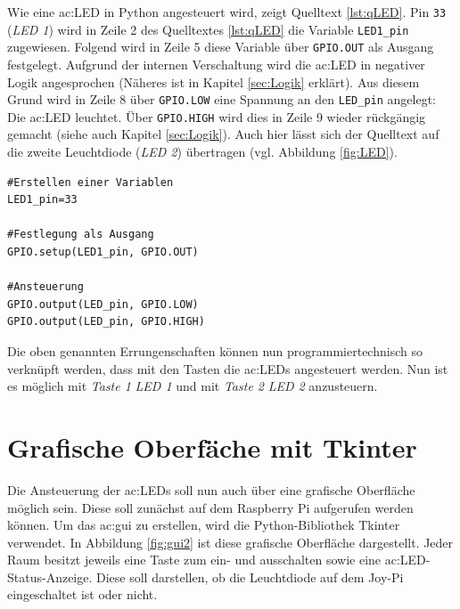 \newpage

Wie eine \gls{ac:LED} in Python angesteuert wird, zeigt Quelltext \ref{lst:qLED}. Pin \texttt{33} (\textit{LED 1}) wird in Zeile 2 des Quelltextes \ref{lst:qLED} die Variable \texttt{LED1\_pin} zugewiesen. Folgend wird in Zeile 5 diese Variable über \texttt{GPIO.OUT} als Ausgang festgelegt. Aufgrund der internen Verschaltung wird die \gls{ac:LED} in negativer Logik angesprochen (Näheres ist in Kapitel \ref{sec:Logik} erklärt). Aus diesem Grund wird in Zeile 8 über \texttt{GPIO.LOW} eine Spannung an den \texttt{LED\_pin} angelegt: Die \gls{ac:LED} leuchtet. Über \texttt{GPIO.HIGH} wird dies in Zeile 9 wieder rückgängig gemacht (siehe auch Kapitel \ref{sec:Logik}). Auch hier lässt sich der Quelltext auf die zweite Leuchtdiode (\textit{LED 2}) übertragen (vgl. Abbildung \ref{fig:LED}).\\[0.2cm]

\begin{lstlisting}[style=python, caption=Python-Code zur Ansteuerung einer LED, label=lst:qLED]
#Erstellen einer Variablen
LED1_pin=33

#Festlegung als Ausgang
GPIO.setup(LED1_pin, GPIO.OUT)

#Ansteuerung
GPIO.output(LED_pin, GPIO.LOW)
GPIO.output(LED_pin, GPIO.HIGH)

\end{lstlisting}

Die oben genannten Errungenschaften können nun programmiertechnisch so verknüpft werden, dass mit den Tasten die \gls{ac:LED}s angesteuert werden. Nun ist es möglich mit \textit{Taste 1} \textit{LED 1} und mit \textit{Taste 2}  \textit{LED 2} anzusteuern.
 
\section{Grafische Oberfäche mit Tkinter}
\label{sec:gui}
Die Ansteuerung der \gls{ac:LED}s soll nun auch über eine grafische Oberfläche möglich sein. Diese soll zunächst auf dem Raspberry Pi aufgerufen werden können. Um das \gls{ac:gui} zu erstellen, wird die Python-Bibliothek Tkinter \cite{latex:tkinter} verwendet.
In Abbildung \ref{fig:gui2} ist diese grafische Oberfläche dargestellt. Jeder Raum besitzt jeweils eine Taste zum ein- und ausschalten sowie eine \gls{ac:LED}-Status-Anzeige. Diese soll darstellen, ob die Leuchtdiode auf dem Joy-Pi eingeschaltet ist oder nicht.


